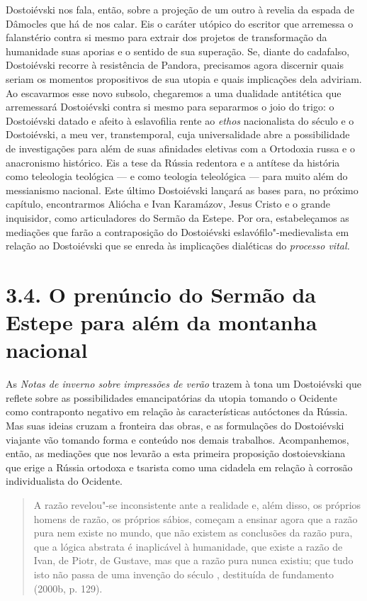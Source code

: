 Dostoiévski nos fala, então, sobre a projeção de um outro à revelia da
espada de Dâmocles que há de nos calar. Eis o caráter utópico do
escritor que arremessa o falanstério contra si mesmo para extrair dos
projetos de transformação da humanidade suas aporias e o sentido de sua
superação. Se, diante do cadafalso, Dostoiévski recorre à resistência de
Pandora, precisamos agora discernir quais seriam os momentos
propositivos de sua utopia e quais implicações dela adviriam. Ao
escavarmos esse novo subsolo, chegaremos a uma dualidade antitética que
arremessará Dostoiévski contra si mesmo para separarmos o joio do trigo:
o Dostoiévski datado e afeito à eslavofilia rente ao \emph{ethos}
nacionalista do século  e o Dostoiévski, a meu ver, transtemporal,
cuja universalidade abre a possibilidade de investigações para além de
suas afinidades eletivas com a Ortodoxia russa e o anacronismo
histórico. Eis a tese da Rússia redentora e a antítese da história como
teleologia teológica --- e como teologia teleológica --- para muito além
do messianismo nacional. Este último Dostoiévski lançará as bases para,
no próximo capítulo, encontrarmos Aliócha e Ivan Karamázov, Jesus Cristo
e o grande inquisidor, como articuladores do Sermão da Estepe. Por ora,
estabeleçamos as mediações que farão a contraposição do Dostoiévski
eslavófilo"-medievalista em relação ao Dostoiévski que se enreda às
implicações dialéticas do \emph{processo vital.}

\section{3.4. O prenúncio do Sermão da Estepe para além da montanha
nacional}

As \emph{Notas de inverno sobre impressões de verão} trazem à tona um
Dostoiévski que reflete sobre as possibilidades emancipatórias da utopia
tomando o Ocidente como contraponto negativo em relação às
características autóctones da Rússia. Mas suas ideias cruzam a fronteira
das obras, e as formulações do Dostoiévski viajante vão tomando forma e
conteúdo nos demais trabalhos. Acompanhemos, então, as mediações que nos
levarão a esta primeira proposição dostoievskiana que erige a Rússia
ortodoxa e tsarista como uma cidadela em relação à corrosão
individualista do Ocidente.

\begin{quote}
A razão revelou"-se inconsistente ante a realidade e, além disso, os
próprios homens de razão, os próprios sábios, começam a ensinar agora
que a razão pura nem existe no mundo, que não existem as conclusões da
razão pura, que a lógica abstrata é inaplicável à humanidade, que existe
a razão de Ivan, de Piotr, de Gustave, mas que a razão pura nunca
existiu; que tudo isto não passa de uma invenção do século ,
destituída de fundamento (2000b, p. 129).
\end{quote}


